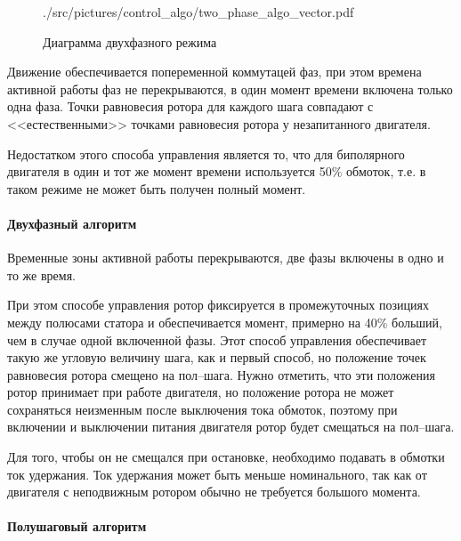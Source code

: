 \begin{figure}
\begin{minipage}{0.45\textwidth}
                        {./src/pictures/control_algo/two_phase_algo_vector.pdf}
        \caption{Диаграмма двухфазного режима}
        \label{pic_two_phase_algo}
    \end{minipage}
\end{figure}

Движение обеспечивается попеременной коммутацей фаз, при этом времена активной работы фаз
не перекрываются, в один момент времени включена только одна фаза. Точки равновесия
ротора для каждого шага совпадают с <<естественными>> точками равновесия ротора у
незапитанного двигателя.

Недостатком этого способа управления является то, что для биполярного двигателя в
один и тот же момент времени используется 50\% обмоток, т.е. в таком
режиме не может быть получен полный момент.

\paragraph{Двухфазный алгоритм}

Временные зоны активной работы перекрываются, две фазы включены в одно и то же
время.

При этом способе управления ротор фиксируется в промежуточных позициях между
полюсами статора и обеспечивается момент, примерно на 40\% больший, чем в случае
одной включенной фазы. Этот способ управления обеспечивает такую же угловую
величину шага, как и первый способ, но положение точек равновесия ротора смещено
на пол--шага. Нужно отметить, что эти положения ротор принимает при работе двигателя,
но положение ротора не может сохраняться неизменным после выключения тока обмоток,
поэтому при включении и выключении питания двигателя ротор будет смещаться на
пол--шага.

Для того, чтобы он не смещался при остановке, необходимо подавать в обмотки ток
удержания. Ток удержания может быть меньше номинального, так как от двигателя с
неподвижным ротором обычно не требуется большого момента.

\paragraph{Полушаговый алгоритм}
\label{section_half_phase_algo}

